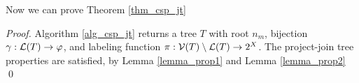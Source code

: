 Now we can prove Theorem \ref{thm_csp_jt}
\begin{proof}
    Algorithm \ref{alg_csp_jt} returns a tree $T$ with root $n_m$, bijection $\gamma : \mathcal{L}(T) \to \varphi$, and labeling function $\pi : \mathcal{V}(T) \setminus \mathcal{L}(T) \to 2^X$.
    The project-join tree properties are satisfied, by Lemma \ref{lemma_prop1} and Lemma \ref{lemma_prop2}
\qed
\end{proof}
